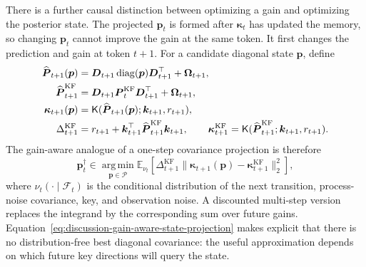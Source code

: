 \documentclass[11pt]{article}
\newcommand{\vct}[1]{\boldsymbol{#1}}
\newcommand{\diag}{\operatorname{diag}}
\begin{document}
There is a further causal distinction between optimizing a gain and optimizing the posterior state.
The projected $\vct{p}_t$ is formed after $\vct{\kappa}_t$ has updated the memory, so changing
$\vct{p}_t$ cannot improve the gain at the same token. It first changes the prediction and gain at
token $t+1$. For a candidate diagonal state $\vct{p}$, define
\begin{align}
  \widehat{\vct{P}}_{t+1}(\vct{p})
  &=\vct{D}_{t+1}\diag(\vct{p})\vct{D}_{t+1}^\top
    +\vct{\Omega}_{t+1}, \notag\\
  \widehat{\vct{P}}_{t+1}^{\mathrm{KF}}
  &=\vct{D}_{t+1}\vct{P}_t^{\mathrm{KF}}\vct{D}_{t+1}^\top
    +\vct{\Omega}_{t+1}, \notag\\
  \vct{\kappa}_{t+1}(\vct{p})
  &=\mathsf{K}(\widehat{\vct{P}}_{t+1}(\vct{p});
    \vct{k}_{t+1},r_{t+1}), \notag\\
  \Delta_{t+1}^{\mathrm{KF}}
  &=r_{t+1}+\vct{k}_{t+1}^\top
    \widehat{\vct{P}}_{t+1}^{\mathrm{KF}}\vct{k}_{t+1},
  \qquad
  \vct{\kappa}_{t+1}^{\mathrm{KF}}
  =\mathsf{K}(\widehat{\vct{P}}_{t+1}^{\mathrm{KF}};
    \vct{k}_{t+1},r_{t+1}).
  \label{eq:discussion-candidate-next-gain}
\end{align}
The gain-aware analogue of a one-step covariance projection is therefore
\begin{equation}
  \vct{p}_t^\dagger
  \in\operatorname*{arg\,min}_{\vct{p}\in\mathcal{P}}
    \mathbb{E}_{\nu_t}\!\left[
      \Delta_{t+1}^{\mathrm{KF}}
      \|\vct{\kappa}_{t+1}(\vct{p})
       -\vct{\kappa}_{t+1}^{\mathrm{KF}}\|_2^2
    \right],
  \label{eq:discussion-gain-aware-state-projection}
\end{equation}
where $\nu_t(\cdot\mid\mathcal{F}_t)$ is the conditional distribution of the next transition,
process-noise covariance, key, and observation noise. A discounted multi-step version replaces the integrand by the corresponding sum
over future gains. Equation~\eqref{eq:discussion-gain-aware-state-projection} makes explicit that
there is no distribution-free best diagonal covariance: the useful approximation depends on which
future key directions will query the state.
\end{document}
